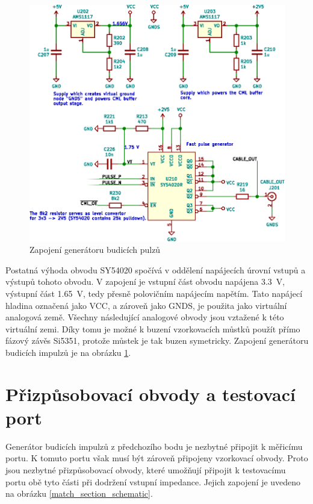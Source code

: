 \begin{figure}[htbp]
\includegraphics[width=\textwidth,keepaspectratio]{images/pulse_generator_section.eps}\caption{Zapojení generátoru budicích pulzů}\label{pulse_generator_section_schematic}
\end{figure}	

Postatná výhoda obvodu SY54020 spočívá v oddělení napájecích úrovní vstupů a výstupů tohoto obvodu. V zapojení je vstupní část obvodu napájena \SI{3.3}{\volt}, výstupní část \SI{1.65}{\volt}, tedy přesně polovičním napájecím napětím. Tato napájecí hladina označená jako VCC, a zároveň jako GNDS, je použita jako virtuální analogová země. Všechny následující analogové obvody jsou vztažené k této virtuální zemi. Díky tomu je možné k buzení vzorkovacích můstků použít přímo fázový závěs Si5351, protože můstek je tak buzen symetricky. Zapojení generátoru budicích impulzů je na obrázku \ref{pulse_generator_section_schematic}.

\section{Přizpůsobovací obvody a testovací port}
Generátor budicích impulzů z předchozího bodu je nezbytné připojit k měřicímu portu. K tomuto portu však musí být zároveň připojeny vzorkovací obvody. Proto jsou nezbytné přizpůsobovací obvody, které umožňují připojit k testovacímu portu obě tyto části při dodržení vstupní impedance. Jejich zapojení je uvedeno na obrázku \ref{match_section_schematic}.

